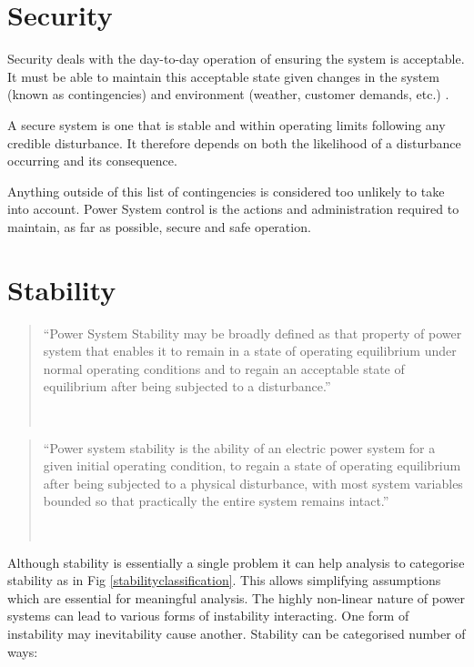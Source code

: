 \documentclass[a4paper,oneside,12pt]{report}
\newcommand{\tmpquotecite}{}%
\newenvironment{myquote}[1][]
{\renewcommand{\tmpquotecite}{#1}\begin{quote}\begin{itshape}``}
{''\end{itshape}~{\normalfont~\tmpquotecite}\end{quote}}
\begin{document}
\section{Security}

Security deals with the day-to-day operation of ensuring the system is acceptable. It must be able to maintain this acceptable state given changes in the system (known as contingencies) and environment (weather, customer demands, etc.) \cite{Balu1992}.

A secure system is one that is stable and within operating limits following any credible disturbance. It therefore depends on both the likelihood of a disturbance occurring and its consequence.

Anything outside of this list of contingencies is considered too unlikely to take into account. Power System control is the actions and administration required to maintain, as far as possible, secure and safe operation.

\section{Stability}\label{lbl_sec_stability}

\begin{myquote}[\cite{Kundur1994}]Power System Stability may be broadly defined as that property of power system that enables it to remain in a state of operating equilibrium under normal operating conditions and to regain an acceptable state of equilibrium after being subjected to a disturbance.\end{myquote}

\begin{myquote}[\cite{Kundur2004}]Power system stability is the ability of an electric power system for a given initial operating condition, to regain a state of operating equilibrium after being subjected to a physical disturbance, with most system variables bounded so that practically the entire system remains intact.\end{myquote}

Although stability is essentially a single problem it can help analysis to categorise stability as in Fig \ref{stabilityclassification}. This allows simplifying assumptions which are essential for meaningful analysis. The highly non-linear nature of power systems can lead to various forms of instability interacting. One form of instability may inevitability cause another. Stability can be categorised number of ways:
\end{document}
